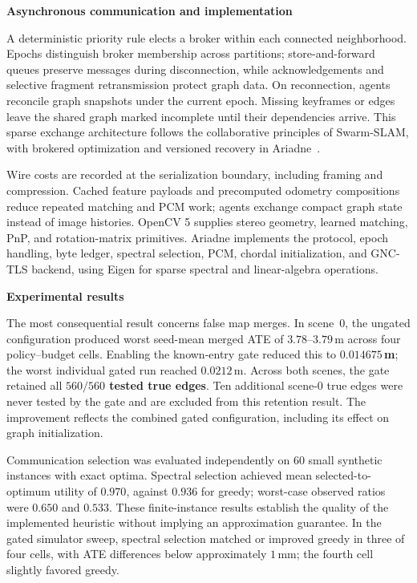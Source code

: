 \documentclass[10pt,a4paper]{article}
\newcommand{\indentedheading}[1]{\par\addvspace{0.65em}\noindent\hspace*{1em}\textbf{#1}\par\smallskip}
\begin{document}
\indentedheading{Asynchronous communication and implementation}

A deterministic priority rule elects a broker within each connected
neighborhood. Epochs distinguish broker membership across partitions;
store-and-forward queues preserve messages during disconnection, while
acknowledgements and selective fragment retransmission protect graph data.
On reconnection, agents reconcile graph snapshots under the current epoch.
Missing keyframes or edges leave the shared graph marked incomplete until
their dependencies arrive. This sparse exchange architecture follows the
collaborative principles of Swarm-SLAM, with brokered optimization and
versioned recovery in Ariadne~\cite{lajoie2024swarmslam}.

Wire costs are recorded at the serialization boundary, including framing and
compression. Cached feature payloads and precomputed odometry compositions
reduce repeated matching and PCM work; agents exchange compact graph state
instead of image histories. OpenCV 5 supplies stereo geometry, learned
matching, PnP, and rotation-matrix primitives. Ariadne implements the
protocol, epoch handling, byte ledger, spectral selection, PCM, chordal
initialization, and GNC-TLS backend, using Eigen for sparse spectral and
linear-algebra operations.

\indentedheading{Experimental results}

The most consequential result concerns false map merges. In scene~0, the
ungated configuration produced worst seed-mean merged ATE of
$3.78$--$3.79$\,m across four policy--budget cells. Enabling the known-entry
gate reduced this to \textbf{$0.014675$\,m}; the worst individual gated run
reached $0.0212$\,m. Across both scenes, the gate retained all
\textbf{$560/560$ tested true edges}. Ten additional scene-0 true edges
were never tested by the gate and are excluded from this retention result.
The improvement reflects the combined gated configuration, including its
effect on graph initialization.

Communication selection was evaluated independently on $60$ small synthetic
instances with exact optima. Spectral selection achieved mean
selected-to-optimum utility of \textbf{$0.970$}, against $0.936$ for greedy;
worst-case observed ratios were $0.650$ and $0.533$. These finite-instance
results establish the quality of the implemented heuristic without implying
an approximation guarantee. In the gated simulator sweep, spectral selection
matched or improved greedy in three of four cells, with ATE differences below
approximately $1$\,mm; the fourth cell slightly favored greedy.
\end{document}
